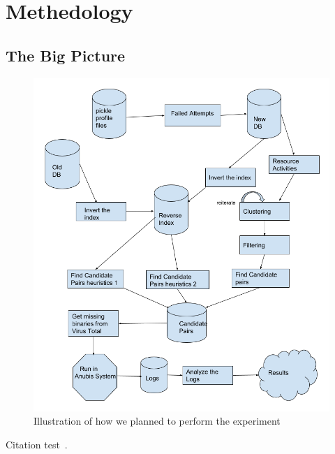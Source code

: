 \chapter{Methedology}\label{chapter:methedology}
\section{The Big Picture}
\begin{figure}[htbp]
  \centering
  \includegraphics[scale=0.4]{figures/bigpicture.png}
  \caption[Big Picture]{Illustration of how we planned to perform the experiment}\label{fig:bigpicture}
\end{figure}
Citation test~\parencite{latex}.